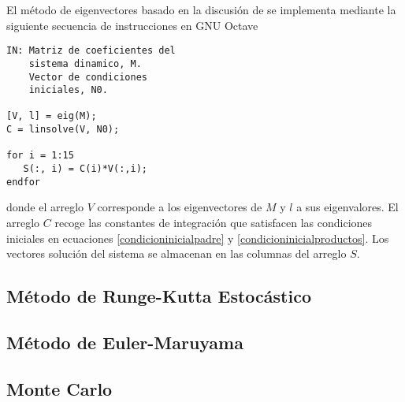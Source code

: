 El método de eigenvectores basado en la discusión de \cite{Hirsch.2004} se implementa mediante la siguiente secuencia de instrucciones en GNU Octave

\begin{lstlisting}
IN: Matriz de coeficientes del 
    sistema dinamico, M.
    Vector de condiciones
    iniciales, N0.

[V, l] = eig(M);
C = linsolve(V, N0);

for i = 1:15
   S(:, i) = C(i)*V(:,i);
endfor
\end{lstlisting}

\noindent donde el arreglo $V$ corresponde a los eigenvectores de $M$ y $l$ a sus eigenvalores. El arreglo $C$ recoge las constantes de integración que satisfacen las condiciones iniciales en ecuaciones \ref{condicioninicialpadre} y \ref{condicioninicialproductos}. Los vectores solución del sistema se almacenan en las columnas del arreglo $S$. 

\subsection{Método de Runge-Kutta Estocástico}

\subsection{Método de Euler-Maruyama}

\subsection{Monte Carlo}
